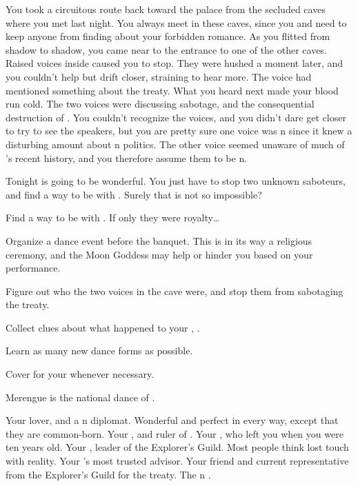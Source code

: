 \documentclass[char]{NeptuneBall}
\begin{document}
You took a circuitous route back toward the palace from the secluded caves where you met \cDiplomat{} last night. You always meet in these caves, since you and \cDiplomat{} need to keep anyone from finding about your forbidden romance. As you flitted from shadow to shadow, you came near to the entrance to one of the other caves. Raised voices inside caused you to stop. They were hushed a moment later, and you couldn't help but drift closer, straining to hear more.  The voice had mentioned something about the treaty. What you heard next made your blood run cold. The two voices were discussing sabotage, and the consequential destruction of \pAtlantis{}. You couldn't recognize the voices, and you didn't dare get closer to try to see the speakers, but you are pretty sure one voice was \pAtlantis{}n since it knew a disturbing amount about \pAtlantis{}n politics. The other voice seemed unaware of much of \pAtlantis{}'s recent history, and you therefore assume them to be \pPacifica{}n.

Tonight is going to be wonderful. You just have to stop two unknown saboteurs, and find a way to be with \cDiplomat{}. Surely that is not so impossible?

\begin{itemz}[Goals]
  \item Find a way to be with \cDiplomat{}. If only they were royalty\ldots
  \item Organize a dance event before the banquet.  This is in its way a religious ceremony, and the Moon Goddess may help or hinder you based on your performance.
  \item Figure out who the two voices in the cave were, and stop them from sabotaging the treaty.
  \item Collect clues about what happened to your \cQueen{\parent}, \cQueen{\King} \cQueen{}.
  \item Learn as many new dance forms as possible.
  \item Cover for your \cKing{\parent} whenever necessary.
\end{itemz}

\begin{itemz}[Trivia]
  \item Merengue is the national dance of \pAtlantis{}.
\end{itemz}

\begin{contacts}
  \contact{\cDiplomat{}} Your lover, and a \pPacifica{}n diplomat. Wonderful and perfect in every way, except that they are common-born.
  \contact{\cKing{}} Your \cKing{\parent}, and ruler of \pAtlantis{}.
  \contact{\cAriel{}} Your \cAriel{\sibling}, who left you when you were ten years old.
  \contact{\cPlant{}} Your \cPlant{\uncle}, leader of the Explorer's Guild. Most people think \cPlant{\they} \cPlant{\have} lost touch with reality.
  \contact{\cManta{}} Your \cKing{\parent}'s most trusted advisor.
  \contact{\cPriest{}} Your friend and current representative from the Explorer's Guild for the treaty.
  \contact{\cPrince{}} The \pPacifica{}n \cPrince{\prince}.
\end{contacts}
\end{document}

